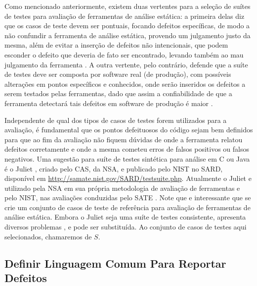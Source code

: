 Como mencionado anteriormente, existem duas vertentes para a seleção de suítes de testes para avaliação de ferramentas de análise estática: a primeira delas diz que os casos de teste devem ser pontuais, focando defeitos específicas, de modo a não confundir a ferramenta de análise estática, provendo um julgamento justo da mesma, além de  evitar a inserção de defeitos não intencionais, que podem esconder o defeito que deveria de fato ser encontrado, levando também ao mau julgamento da ferramenta \cite{pascal}. A outra vertente, pelo contrário, defende que a suíte de testes deve ser composta por software real (de produção), com possíveis alterações em pontos específicos e conhecidos,  onde serão inseridos os defeitos a serem testados  pelas ferramentas, dado que assim a confiabilidade de que a ferramenta detectará tais defeitos em software de produção  é maior \cite{harvard}.

Independente de qual dos tipos de casos de testes forem utilizados para a avaliação, é fundamental que os pontos defeituosos do código sejam bem definidos para que ao fim da avaliação não fiquem dúvidas de onde a ferramenta relatou defeitos corretamente e onde a mesma cometeu erros de falsos positivos ou falsos negativos.
Uma sugestão para suíte de testes sintética para análise em C ou Java é o Juliet \cite{juliet}, criado pelo CAS, da NSA, e publicado pelo NIST no SARD, disponível em \url{http://samate.nist.gov/SARD/testsuite.php}. Atualmente o Juliet e utilizado pela NSA em sua própria metodologia de avaliação de ferramentas \cite{nsa} e pelo NIST, nas avaliações conduzidas pelo SATE \cite{sate_iv}. Note que e interessante que se crie um conjunto de casos de teste de referência para avaliação de ferramentas de análise estática. Embora o Juliet seja uma suíte de testes consistente, apresenta diversos problemas  \cite{pascal}, \cite{juliet} e pode ser substituída.
Ao conjunto de casos de testes aqui selecionados, chamaremos de $S$.

\subsection{Definir Linguagem Comum Para Reportar Defeitos}

